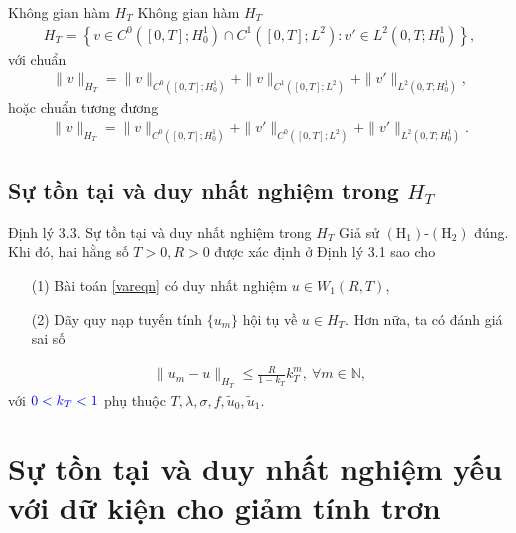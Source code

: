 \documentclass[9pt]{beamer}
\begin{document}
\begin{frame}
    \begin{exampleblock}{Không gian hàm $H_T$}
    Không gian hàm $H_T$
    \begin{align}
        H_T = \left\{ v \in C^0([0,T]; H^1_0) \cap C^1([0,T]; L^2) \colon v' \in L^2(0,T;H^1_0) \right\},
    \end{align}
    với chuẩn
    \begin{align}
        \|v\|_{H_T} = \|v\|_{C^0([0,T]; H^1_0)} + \|v\|_{C^1([0,T]; L^2)} + \|v'\|_{L^2(0,T;H^1_0)},
    \end{align}
    hoặc chuẩn tương đương
    \begin{align}
        \|v\|_{H_T} = \|v\|_{C^0([0,T]; H^1_0)} + \|v'\|_{C^0([0,T]; L^2)} + \|v'\|_{L^2(0,T;H^1_0)}.
    \end{align}
    \end{exampleblock}
\end{frame}

\subsection{Sự tồn tại và duy nhất nghiệm trong $H_T$}

\begin{frame}
     \begin{block}{Định lý 3.3. Sự tồn tại và duy nhất nghiệm trong $H_T$}
        Giả sử $(\text{H}_1)$-$(\text{H}_2)$ đúng. Khi đó, hai hằng số $T > 0, R > 0$ được xác định ở Định lý 3.1 sao cho
        \begin{itemize}
            \item[(1)] Bài toán \eqref{vareqn} có duy nhất nghiệm $u \in W_1(R,T)$,
            \item[(2)] Dãy quy nạp tuyến tính $\{u_m\}$ hội tụ về $u \in H_T$. Hơn nữa, ta có đánh giá sai số
        \end{itemize}
        \begin{align}
            \|u_m - u\|_{H_T} \le \frac{R}{1 - k_T} k_T^m, \ \forall m \in \mathbb{N},
        \end{align}
        với $\color{blue} 0 < k_T < 1$ phụ thuộc $T, \lambda, \sigma, f, \tilde{u}_0, \tilde{u}_1$.
    \end{block}    
\end{frame}

\section{Sự tồn tại và duy nhất nghiệm yếu với dữ kiện cho giảm tính trơn}
\end{document}
